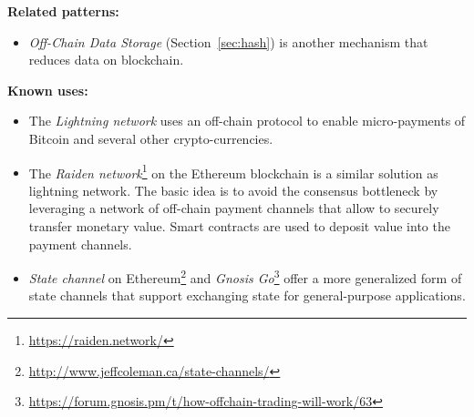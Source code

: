
\vspace{0.5em}\noindent \textbf{Related patterns:} 
\begin{itemize}
    \item \textit{Off-Chain Data Storage} (Section~\ref{sec:hash}) is another mechanism that reduces data on blockchain. 
\end{itemize}

\vspace{0.5em}\noindent \textbf{Known uses:}
\begin{itemize}
  \item The \textit{Lightning network} uses an off-chain protocol to enable micro-payments of Bitcoin and several other crypto-currencies. %

  \item The \textit{Raiden network}\footnote{\label{raiden}\url{https://raiden.network/}} on the Ethereum blockchain is a similar solution as lightning network. The basic idea is to avoid the consensus bottleneck by leveraging a network of off-chain payment channels that allow to securely transfer monetary value. Smart contracts are used to deposit value into the payment channels.
  
  
  \item \textit{State channel} on Ethereum\footnote{\url{http://www.jeffcoleman.ca/state-channels/}} and \textit{Gnosis Go}\footnote{\url{https://forum.gnosis.pm/t/how-offchain-trading-will-work/63}} offer a more generalized form of state channels that support exchanging state for general-purpose applications. 

\end{itemize}


